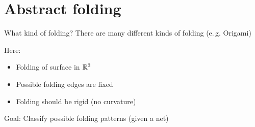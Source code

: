 \section{Abstract folding}
\frame{\tableofcontents[currentsection]}

\begin{frame}{What kind of folding?}
    \pause
    There are many different kinds of folding (e.\,g. Origami)

    \pause
    Here:
    \begin{itemize}
        \pause
        \item Folding of surface in $\mathbb{R}^3$
        \pause
        \item Possible folding edges are fixed
        \pause
        \item Folding should be rigid (no curvature)
    \end{itemize}

    \pause
    Goal: Classify possible folding patterns (given a net)

    \pause
    \begin{center}
    \end{center}

\end{frame}


